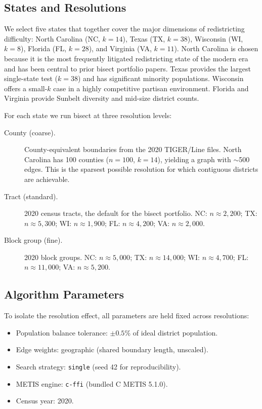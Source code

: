 \subsection{States and Resolutions}

We select five states that together cover the major dimensions of
redistricting difficulty: North Carolina (NC, $k=14$), Texas (TX, $k=38$),
Wisconsin (WI, $k=8$), Florida (FL, $k=28$), and Virginia (VA, $k=11$).
North Carolina is chosen because it is the most frequently litigated
redistricting state of the modern era and has been central to prior bisect
portfolio papers.  Texas provides the largest single-state test ($k=38$) and
has significant minority populations.  Wisconsin offers a small-$k$ case
in a highly competitive partisan environment.  Florida and Virginia provide
Sunbelt diversity and mid-size district counts.

For each state we run bisect at three resolution levels:

\begin{description}
  \item[County (coarse).] County-equivalent boundaries from the 2020
    TIGER/Line files.  North Carolina has 100 counties ($n=100$, $k=14$),
    yielding a graph with $\sim$500 edges.  This is the sparsest possible
    resolution for which contiguous districts are achievable.
  \item[Tract (standard).] 2020 census tracts, the default for the bisect
    portfolio.  NC: $n \approx 2{,}200$; TX: $n \approx 5{,}300$; WI:
    $n \approx 1{,}900$; FL: $n \approx 4{,}200$; VA: $n \approx 2{,}000$.
  \item[Block group (fine).] 2020 block groups.  NC: $n \approx 5{,}000$;
    TX: $n \approx 14{,}000$; WI: $n \approx 4{,}700$; FL: $n \approx
    11{,}000$; VA: $n \approx 5{,}200$.
\end{description}

\subsection{Algorithm Parameters}

To isolate the resolution effect, all parameters are held fixed across
resolutions:

\begin{itemize}
  \item Population balance tolerance: $\pm0.5\%$ of ideal district
        population.
  \item Edge weights: geographic (shared boundary length, unscaled).
  \item Search strategy: \texttt{single} (seed 42 for reproducibility).
  \item METIS engine: \texttt{c-ffi} (bundled C METIS 5.1.0).
  \item Census year: 2020.
\end{itemize}

